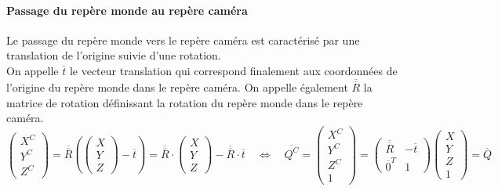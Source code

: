 \documentclass[a4paper, 11pt]{article}
\begin{document}
	\paragraph{Passage du repère monde au repère caméra\\}
		Le passage du repère monde vers le repère caméra est caractérisé par une translation de l'origine suivie d'une rotation.
		\\On appelle $\overline{t}$ le vecteur translation qui correspond finalement aux coordonnées de l'origine du repère monde dans le repère caméra. On appelle également $\overline{\overline{R}}$ la matrice de rotation définissant la rotation du repère monde dans le repère caméra.
		\begin{equation}
			\begin{pmatrix}
				X^C\\Y^C\\Z^C
			\end{pmatrix} = \overline{\overline{R}} \left( \begin{pmatrix}
				X\\Y\\Z
			\end{pmatrix} - \overline{t} \right) = \overline{\overline{R}} \cdot \begin{pmatrix}
			X\\Y\\Z
			\end{pmatrix} - \overline{\overline{R}} \cdot \overline{t} \quad\Leftrightarrow\quad
			\overline{Q^C} = 
			\begin{pmatrix}
				X^C\\Y^C\\Z^C\\1
			\end{pmatrix} = \begin{pmatrix}
				\overline{\overline{R}} & -\overline{t}\\
				\overline{0}^T & 1
			\end{pmatrix} \begin{pmatrix}
				X\\Y\\Z\\1
			\end{pmatrix} = \overline{Q}
		\end{equation}
\end{document}
